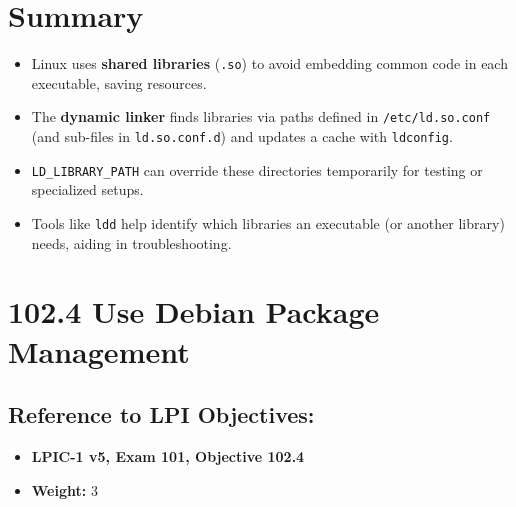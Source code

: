 \documentclass[12pt,a4paper]{report}
\begin{document}
\section*{Summary}

\begin{itemize}
    \item Linux uses \textbf{shared libraries} (\texttt{.so}) to avoid embedding common code in each executable, saving resources.
    \item The \textbf{dynamic linker} finds libraries via paths defined in \texttt{/etc/ld.so.conf} (and sub-files in \texttt{ld.so.conf.d}) and updates a cache with \texttt{ldconfig}.
    \item \texttt{LD\_LIBRARY\_PATH} can override these directories temporarily for testing or specialized setups.
    \item Tools like \texttt{ldd} help identify which libraries an executable (or another library) needs, aiding in troubleshooting.
\end{itemize}










\newpage

\section*{102.4 Use Debian Package Management}

\subsection*{Reference to LPI Objectives:}
\begin{itemize}
    \item \textbf{LPIC-1 v5, Exam 101, Objective 102.4}
    \item \textbf{Weight:} 3
\end{itemize}
\end{document}
